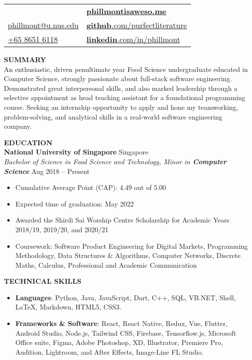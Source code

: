 \documentclass[a4paper, 11pt]{article}
\makeatletter
\newcommand{\interspace}{\vspace{10pt}}
\newcommand{\name}{Phillmont Muktar}
\newcommand{\cname}{\begin{CJK*}{UTF8}{zhsong}郑传期\end{CJK*}}
\newcommand{\tel}{\href{tel:86516118}{+65 8651 6118}}
\newcommand{\email}{\href{mailto:phillmont@u.nus.edu}{phillmont@u.nus.edu}}
\newcommand{\linkedin}{\href{http://linkedin.com/in/phillmont}{\textbf{linkedin}.com/in/phillmont}}
\newcommand{\github}{\href{http://github.com/purfectliterature}{\textbf{github}.com/purfectliterature}}
\newcommand{\mysite}{\href{https://phillmontisaweso.me}{\textbf{phillmontisaweso.me}}}
\makeatother
\begin{document}
	\sffamily
	
	\begin{tabularx}{\linewidth}{@{}X l@{}}
		{\Large \textbf{\name, \cname}} & \faLink \space\space \mysite\\ 
		\faEnvelope \space\space \email & \faGithub \space\space \github\\
		\faPhone \space\space \tel & \faLinkedin \space\space \linkedin
	\end{tabularx}

	\interspace
	
	\textbf{\large SUMMARY} \hrulefill \\
	An enthusiastic, driven penultimate year Food Science undergraduate educated in Computer Science, strongly passionate about full-stack software engineering. Demonstrated great interpersonal skills, and also marked leadership through a selective appointment as head teaching assistant for a foundational programming course. Seeking an internship opportunity to apply and hone my teamworking, problem-solving, and analytical skills in a real-world software engineering company.
	
	\interspace

	\textbf{\large EDUCATION} \hrulefill \\
	\textbf{National University of Singapore} \hfill Singapore\\
	\textit{Bachelor of Science in Food Science and Technology, Minor in \textbf{Computer Science}} \hfill Aug 2018 -- Present
	\begin{itemize}[leftmargin=*, noitemsep, topsep=0pt]
		\item Cumulative Average Point (CAP): 4.49 out of 5.00
		\item Expected time of graduation: May 2022
		\item Awarded the Shirdi Sai Worship Centre Scholarship for Academic Years 2018/19, 2019/20, and 2020/21
		\item Coursework: Software Product Engineering for Digital Markets, Programming Methodology, Data Structures \& Algorithms, Computer Networks, Discrete Maths, Calculus, Professional and Academic Communication
	\end{itemize}
	
	\interspace
	
	\textbf{\large TECHNICAL SKILLS} \hrulefill
	\begin{itemize}[leftmargin=*, noitemsep, topsep=0pt]
		\item \textbf{Languages}: Python, Java, JavaScript, Dart, C++, SQL, VB.NET, Shell, \LaTeX, Markdown, HTML5, CSS3.
		\item \textbf{Frameworks \& Software}: React, React Native, Redux, Vue, Flutter, Android Studio, Node.js, Tailwind CSS, Firebase, Tensorflow.js, Microsoft Office suite, Figma, Adobe Photoshop, XD, Illustrator, Premiere Pro, Audition, Lightroom, and After Effects, Image-Line FL Studio.
	\end{itemize}
\end{document}

